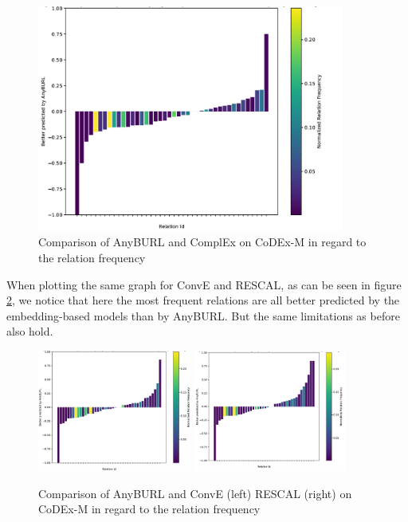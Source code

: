 \begin{figure}[H]
\centering
\includegraphics[width=0.9\textwidth]{images/relation_freq_anyburl_complex_codex.PNG}
\caption{Comparison of AnyBURL and ComplEx on CoDEx-M in regard to the relation frequency}
\label{fig:relation_freq_anyburl_complex_codex}
\end{figure}

When plotting the same graph for ConvE and RESCAL, as can be seen in figure \ref{fig:relation_freq_anyburl_conve_rescal_codex}, we notice that here the most frequent relations are all better predicted by the embedding-based models than by AnyBURL. But the same limitations as before also hold.

\begin{figure}[H]
\centering
\includegraphics[width=0.45\textwidth]{images/relation_freq_anyburl_conve_codex.PNG}
\includegraphics[width=0.45\textwidth]{images/relation_freq_anyburl_rescal_codex.PNG}
\caption{Comparison of AnyBURL and ConvE (left) RESCAL (right) on CoDEx-M in regard to the relation frequency}
\label{fig:relation_freq_anyburl_conve_rescal_codex}
\end{figure}

